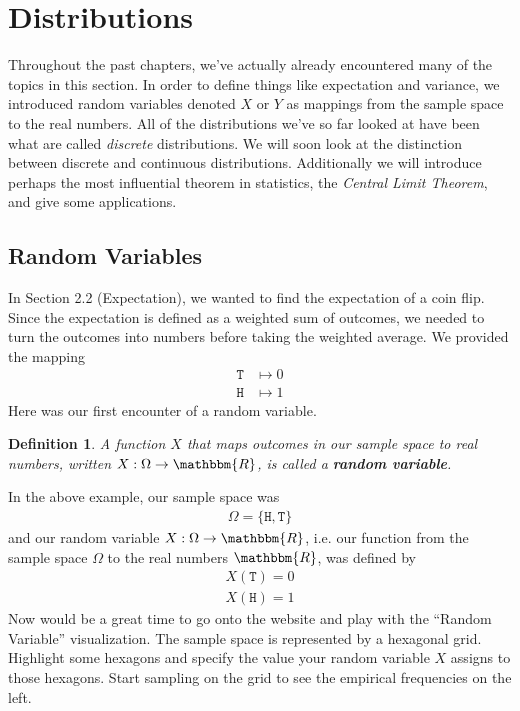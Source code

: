 \documentclass[11pt,letterpaper]{article}
\newcommand\real{\mathbbm{R}}
\newcommand\hd{\texttt{H}}
\newcommand\tl{\texttt{T}}
\numberwithin{theorem}{section}
\newtheorem{definition}[theorem]{Definition}
\numberwithin{definition}{section}
\numberwithin{lemma}{section}
\numberwithin{corollary}{section}
\numberwithin{proposition}{section}
\theoremstyle{definition}
\numberwithin{remark}{section}
\numberwithin{claim}{section}
\numberwithin{observation}{section}
\numberwithin{fact}{section}
\numberwithin{assumption}{section}
\numberwithin{example}{section}
\numberwithin{exercise}{section}
\begin{document}
\section{Distributions}
Throughout the past chapters, we've actually already encountered many of the topics in this section. In order to define things like expectation and variance, we introduced random variables denoted $X$ or $Y$ as mappings from the sample space to the real numbers. All of the distributions we've so far looked at have been what are called \textit{discrete} distributions. We will soon look at the distinction between discrete and continuous distributions. Additionally we will introduce perhaps the most influential theorem in statistics, the \textit{Central Limit Theorem}, and give some applications.


\subsection{Random Variables}

In Section 2.2 (Expectation), we wanted to find the expectation of a coin flip. Since the expectation is defined as a weighted sum of outcomes, we needed to turn the outcomes into numbers before taking the weighted average. We provided the mapping
\begin{align*}
\tl &\mapsto 0 \\
\hd &\mapsto 1
\end{align*}
Here was our first encounter of a random variable. 
\begin{definition}
A function $X$ that maps outcomes in our sample space to real numbers, written $X : \Omega \to \real$, is called a \textbf{random variable}.
\end{definition}
In the above example, our sample space was
\begin{align*}
\Omega = \{\hd , \tl\}
\end{align*}
and our random variable $X : \Omega \to \real$, i.e. our function from the sample space $\Omega$ to the real numbers $\real$, was defined by
\begin{align*}
X(\tl) = 0 \\
X(\hd) = 1
\end{align*}
Now would be a great time to go onto the website and play with the ``Random Variable'' visualization. The sample space is represented by a hexagonal grid. Highlight some hexagons and specify the value your random variable $X$ assigns to those hexagons. Start sampling on the grid to see the empirical frequencies on the left.
\end{document}

